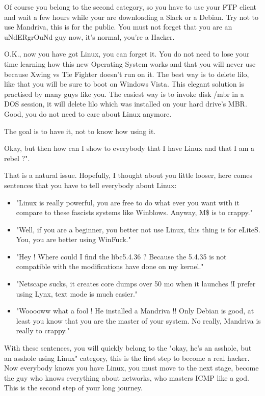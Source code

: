 Of course you belong to the second category, so you have to use your FTP client and wait a few hours while your are downloading a Slack or a Debian. Try not to use Mandriva, this is for the public. You must not forget that you are an uNdERgrOuNd guy now, it's normal, you're a Hacker.

O.K., now you have got Linux, you can forget it. You do not need to lose your time learning how this new Operating System works and that you will never use because Xwing vs Tie Fighter doesn't run on it. The best way is to delete lilo, like that you will be sure to boot on Windows Vista. This elegant solution is practised by many guys like you. The easiest way is to invoke disk /mbr in a DOS session, it will delete lilo which was installed on your hard drive's MBR. Good, you do not need to care about Linux anymore.

The goal is to have it, not to know how using it.

Okay, but then how can I show to everybody that I have Linux and that I am a rebel ?". 

That is a natural issue. Hopefully, I thought about you little looser, here comes sentences that you have to tell everybody about Linux:

\begin{itemize}
	\item "Linux is really powerful, you are free to do what ever you want with it compare to these fascists systems like Winblows. Anyway, M\$ is to crappy."

	\item "Well, if you are a beginner, you better not use Linux, this thing is for eLiteS. You, you are better using WinFuck."

	\item "Hey ! Where could I find the libc5.4.36 ? Because the 5.4.35 is not compatible with the modifications have done on my kernel."

	\item "Netscape sucks, it creates core dumps over 50 mo when it launches !I prefer using Lynx, text mode is much easier."

	\item "Wooooww what a fool ! He installed a Mandriva !! Only Debian is good, at least you know that you are the master of your system. No really, Mandriva is really to crappy."
\end{itemize}

With these sentences, you will quickly belong to the "okay, he's an asshole, but an asshole using Linux" category, this is the first step to become a real hacker. Now everybody knows you have Linux, you must move to the next stage, become the guy who knows everything about networks, who masters ICMP like a god. This is the second step of your long journey.

